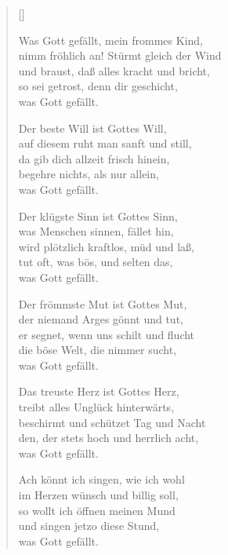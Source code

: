 \begin{multicols}{2}
\settowidth{\versewidth}{Was Gott gefällt, mein frommes Kind,}
\begin{verse}[\versewidth]

 Was Gott gefällt, mein frommes Kind,\\
nimm fröhlich an! Stürmt gleich der Wind\\
und braust, daß alles kracht und bricht,\\
so sei getrost, denn dir geschicht,\\
was Gott gefällt.

 Der beste Will ist Gottes Will,\\
auf diesem ruht man sanft und still,\\
da gib dich allzeit frisch hinein,\\
begehre nichts, als nur allein,\\
was Gott gefällt.

 Der klügste Sinn ist Gottes Sinn,\\
was Menschen sinnen, fället hin,\\
wird plötzlich kraftlos, müd und laß,\\
tut oft, was bös, und selten das,\\
was Gott gefällt.

 Der frömmste Mut ist Gottes Mut,\\
der niemand Arges gönnt und tut,\\
er segnet, wenn uns schilt und flucht\\
die böse Welt, die nimmer sucht,\\
was Gott gefällt.

 Das treuste Herz ist Gottes Herz,\\
treibt alles Unglück hinterwärts,\\
beschirmt und schützet Tag und Nacht\\
den, der stets hoch und herrlich acht,\\
was Gott gefällt.

 Ach könnt ich singen, wie ich wohl\\
im Herzen wünsch und billig soll,\\
so wollt ich öffnen meinen Mund\\
und singen jetzo diese Stund,\\
was Gott gefällt.


\end{verse}
\end{multicols}
